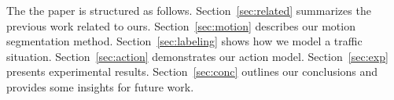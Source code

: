 The the paper is structured as follows. Section~\ref{sec:related}
summarizes the previous work related to ours. Section~\ref{sec:motion}
describes our motion segmentation method. Section~\ref{sec:labeling}
shows how we model a traffic situation. Section~\ref{sec:action} demonstrates
our action model. Section~\ref{sec:exp} presents experimental results.
Section~\ref{sec:conc} outlines our conclusions and provides some insights for
future work.
